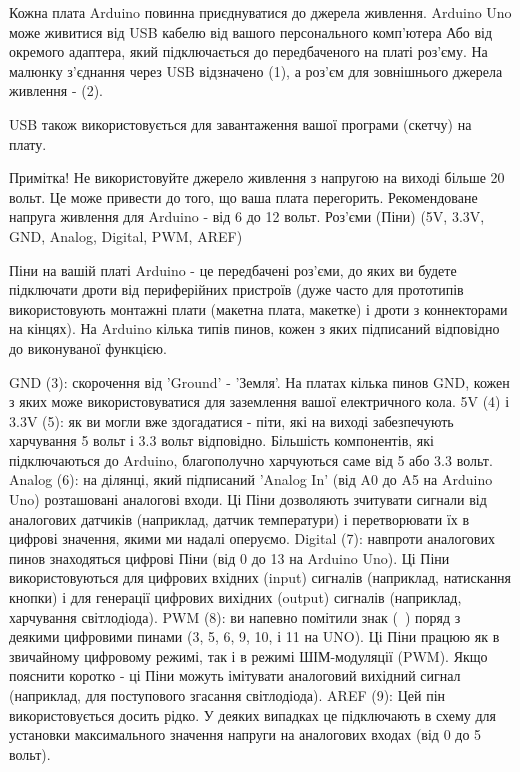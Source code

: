 \documentclass[12pt,a4paper]{report}  %
\begin{document}
Кожна плата Arduino повинна приєднуватися до джерела живлення. Arduino Uno може живитися від USB кабелю від вашого персонального комп'ютера Або від окремого адаптера, який підключається до передбаченого на платі роз'єму. На малюнку з'єднання через USB відзначено (1), а роз'єм для зовнішнього джерела живлення - (2).

USB також використовується для завантаження вашої програми (скетчу) на плату.

Примітка! Не використовуйте джерело живлення з напругою на виході більше 20 вольт. Це може привести до того, що ваша плата перегорить. Рекомендоване напруга живлення для Arduino - від 6 до 12 вольт.
Роз'єми (Піни) (5V, 3.3V, GND, Analog, Digital, PWM, AREF)

Піни на вашій платі Arduino - це передбачені роз'єми, до яких ви будете підключати дроти від периферійних пристроїв (дуже часто для прототипів використовують монтажні плати (макетна плата, макетке) і дроти з коннекторами на кінцях). На Arduino кілька типів пинов, кожен з яких підписаний відповідно до виконуваної функцією.

    GND (3): скорочення від 'Ground' - 'Земля'. На платах кілька пинов GND, кожен з яких може використовуватися для заземлення вашої електричного кола.
    5V (4) і 3.3V (5): як ви могли вже здогадатися - піти, які на виході забезпечують харчування 5 вольт і 3.3 вольт відповідно. Більшість компонентів, які підключаються до Arduino, благополучно харчуються саме від 5 або 3.3 вольт.
    Analog (6): на ділянці, який підписаний 'Analog In' (від A0 до A5 на Arduino Uno) розташовані аналогові входи. Ці Піни дозволяють зчитувати сигнали від аналогових датчиків (наприклад, датчик температури) і перетворювати їх в цифрові значення, якими ми надалі оперуємо.
    Digital (7): навпроти аналогових пинов знаходяться цифрові Піни (від 0 до 13 на Arduino Uno). Ці Піни використовуються для цифрових вхідних (input) сигналів (наприклад, натискання кнопки) і для генерації цифрових вихідних (output) сигналів (наприклад, харчування світлодіода).
    PWM (8): ви напевно помітили знак (~) поряд з деякими цифровими пинами (3, 5, 6, 9, 10, і 11 на UNO). Ці Піни працюю як в звичайному цифровому режимі, так і в режимі ШІМ-модуляції (PWM). Якщо пояснити коротко - ці Піни можуть імітувати аналоговий вихідний сигнал (наприклад, для поступового згасання світлодіода).
    AREF (9): Цей пін використовується досить рідко. У деяких випадках це підключають в схему для установки максимального значення напруги на аналогових входах (від 0 до 5 вольт).
\end{document}

